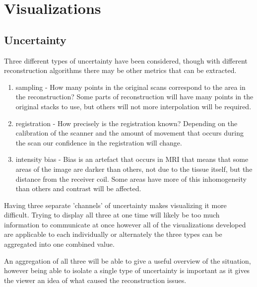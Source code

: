 
\clearpage
\section{Visualizations}

\subsection{Uncertainty}\label{method:uncertainty}
Three different types of uncertainty have been considered, though with different reconstruction algorithms there may be other metrics that can be extracted.

\begin{enumerate}
  \item sampling - How many points in the original scans correspond to the area in the reconstruction? Some parts of reconstruction will have many points in the original stacks to use, but others will not more interpolation will be required.
  \item registration - How precisely is the registration known? Depending on the calibration of the scanner and the amount of movement that occurs during the scan our confidence in the registration will change.
  \item intensity bias - Bias is an artefact that occurs in MRI that means that some areas of the image are darker than others, not due to the tissue itself, but the distance from the receiver coil. Some areas have more of this inhomogeneity than others and contrast will be affected.
\end{enumerate}

Having three separate 'channels' of uncertainty makes visualizing it more difficult. Trying to display all three at one time will likely be too much information to communicate at once however all of the visualizations developed are applicable to each individually or alternately the three types can be aggregated into one combined value.

An aggregation of all three will be able to give a useful overview of the situation, however being able to isolate a single type of uncertainty is important as it gives the viewer an idea of what caused the reconstruction issues.


